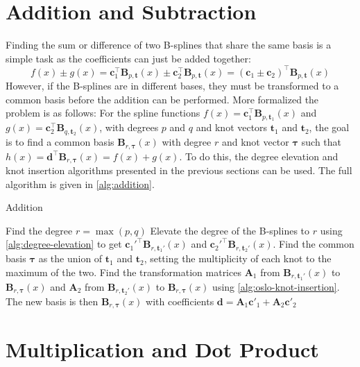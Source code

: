 \section{Addition and Subtraction}

Finding the sum or difference of two B-splines that share the same basis is a simple task as the coefficients can just be added together:
\begin{equation}
    f(x) \pm g(x) = \mathbf{c}_1^{\top} \mathbf{B}_{p, \mathbf{t}}(x) \pm \mathbf{c}_2^{\top} \mathbf{B}_{p, \mathbf{t}}(x) 
    =(\mathbf{c}_1 \pm \mathbf{c}_2)^{\top} \mathbf{B}_{p, \mathbf{t}}(x)
\end{equation}
However, if the B-splines are in different bases, they must be transformed to a common basis before the addition can be performed. More formalized the problem is as follows: For the spline functions $f(x) = \mathbf{c}_1^{\top} \mathbf{B}_{p, \mathbf{t}_1}(x)$ and $g(x) = \mathbf{c}_2^{\top} \mathbf{B}_{q, \mathbf{t}_2}(x)$, with degrees $p$ and $q$ and knot vectors $\mathbf t_1$ and $\mathbf t_2$, the goal is to find a common basis $\mathbf{B}_{r, \boldsymbol{\tau}}(x)$ with degree $r$ and knot vector $\boldsymbol{\tau}$ such that $h(x) = \mathbf d^{\top} \mathbf{B}_{r, \boldsymbol{\tau}}(x) = f(x) + g(x)$. To do this, the degree elevation and knot insertion algorithms presented in the previous sections can be used. The full algorithm is given in \cref{alg:addition}.

\begin{algorithm}
    \caption{Addition}\label{alg:addition}
    \begin{algorithmic}
        \State Find the degree $r = \max(p, q)$
        \State Elevate the degree of the B-splines to $r$ using \cref{alg:degree-elevation} to get $\mathbf c_1'^\top\mathbf B_{r, \mathbf t_1'}(x)$ and $\mathbf c_2'^\top\mathbf B_{r, \mathbf t_2'}(x)$.
        \State Find the common basis $\boldsymbol{\tau}$ as the union of $\mathbf t_1$ and $\mathbf t_2$, setting the multiplicity of each knot to the maximum of the two.
        \State Find the transformation matrices $\mathbf A_1$ from $\mathbf B_{r, \mathbf t_1'}(x)$ to $\mathbf B_{r, \boldsymbol{\tau}}(x)$ and $\mathbf A_2$ from $\mathbf B_{r, \mathbf t_2'}(x)$ to $\mathbf B_{r, \boldsymbol{\tau}}(x)$ using \cref{alg:oslo-knot-insertion}.
        \State The new basis is then $\mathbf B_{r, \boldsymbol{\tau}}(x)$ with coefficients $\mathbf{d} = \mathbf A_1 \mathbf c'_1 + \mathbf A_2 \mathbf c'_2$
    \end{algorithmic}
\end{algorithm}




\section{Multiplication and Dot Product}

